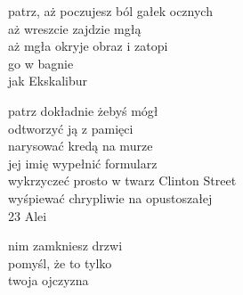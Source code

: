 \begin{text}
    patrz, aż poczujesz ból gałek ocznych\\
    aż wreszcie zajdzie mgłą\\
    aż mgła okryje obraz i zatopi\\
    go w bagnie\\
    jak Ekskalibur

    patrz dokładnie żebyś mógł\\
    odtworzyć ją z pamięci\\
    narysować kredą na murze\\
    jej imię wypełnić formularz\\
    wykrzyczeć prosto w twarz Clinton Street\\
    wyśpiewać chrypliwie na opustoszałej\\
    23 Alei

    nim zamkniesz drzwi\\
    pomyśl, że to tylko\\
    twoja ojczyzna
\end{text}
\begin{chord}

\end{chord}
